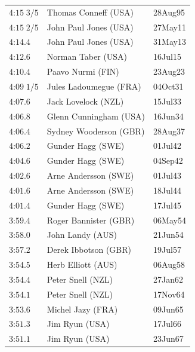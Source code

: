 \begin{figure}
{{\begin{tabular}[t]{|l|ll|}
           $\text{4:15}\;3/5$   &Thomas Conneff (USA)       &28Aug95 \\
           $\text{4:15}\;2/5$   &John Paul Jones (USA)      &27May11 \\
           $\text{4:14}.4$      &John Paul Jones (USA)      &31May13 \\
           $\text{4:12}.6$      &Norman Taber (USA)         &16Jul15 \\
           $\text{4:10}.4$      &Paavo Nurmi (FIN)          &23Aug23 \\
           $\text{4:09}\;1/5$   &Jules Ladoumegue (FRA)     &04Oct31 \\
           $\text{4:07}.6$      &Jack Lovelock (NZL)        &15Jul33 \\
           $\text{4:06}.8$      &Glenn Cunningham (USA)     &16Jun34 \\
           $\text{4:06}.4$      &Sydney Wooderson (GBR)     &28Aug37 \\
           $\text{4:06}.2$      &Gunder Hagg (SWE)          &01Jul42 \\
           $\text{4:04}.6$      &Gunder Hagg (SWE)          &04Sep42 \\
           $\text{4:02}.6$      &Arne Andersson (SWE)       &01Jul43 \\
           $\text{4:01}.6$      &Arne Andersson (SWE)       &18Jul44 \\
           $\text{4:01}.4$      &Gunder Hagg (SWE)          &17Jul45 \\
           $\text{3:59}.4$      &Roger Bannister (GBR)      &06May54 \\
           $\text{3:58}.0$      &John Landy (AUS)           &21Jun54 \\
           $\text{3:57}.2$      &Derek Ibbotson (GBR)       &19Jul57 \\
           $\text{3:54}.5$      &Herb Elliott (AUS)         &06Aug58 \\
           $\text{3:54}.4$      &Peter Snell (NZL)          &27Jan62 \\
           $\text{3:54}.1$      &Peter Snell (NZL)          &17Nov64 \\
           $\text{3:53}.6$      &Michel Jazy (FRA)          &09Jun65 \\
           $\text{3:51}.3$      &Jim Ryun (USA)             &17Jul66 \\
           $\text{3:51}.1$      &Jim Ryun (USA)             &23Jun67 \\

\end{tabular}}}
\end{figure}
